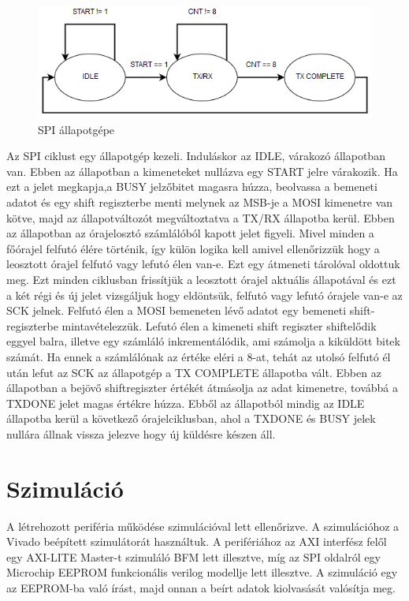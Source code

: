 \documentclass[a4paper,11pt]{article}
\begin{document}
\begin{figure}[H]
	\begin{center}
	\includegraphics[scale=0.6]{spi_statemachine.png}
	\caption{SPI állapotgépe}
	\label{fig:spistatemchn}
	\end{center}
\end{figure}


Az SPI ciklust egy állapotgép kezeli. Induláskor az IDLE, várakozó állapotban van. Ebben az állapotban a kimeneteket nullázva egy START jelre várakozik. Ha ezt a jelet megkapja,a BUSY jelzőbitet magasra húzza, beolvassa a bemeneti adatot és egy shift regiszterbe menti melynek az MSB-je a MOSI kimenetre van kötve, majd az állapotváltozót megváltoztatva a TX/RX állapotba kerül. Ebben az állapotban az órajelosztó számlálóból kapott jelet figyeli. Mivel minden a főórajel felfutó élére történik, így külön logika kell amivel ellenőrizzük hogy a leosztott órajel felfutó vagy lefutó élen van-e. Ezt egy átmeneti tárolóval oldottuk meg. Ezt minden ciklusban frissítjük a leosztott órajel aktuális állapotával és ezt a két régi és új jelet vizsgáljuk hogy eldöntsük, felfutó vagy lefutó órajele van-e az SCK jelnek. Felfutó élen a MOSI bemeneten lévő adatot egy bemeneti shift-regiszterbe mintavételezzük. Lefutó élen a kimeneti shift regiszter shiftelődik eggyel balra, illetve egy számláló inkrementálódik, ami számolja a kiküldött bitek számát. Ha ennek a számlálónak az értéke eléri a 8-at, tehát az utolsó felfutó él után lefut az SCK az állapotgép a TX COMPLETE állapotba vált. Ebben az állapotban a bejövő shiftregiszter értékét átmásolja az adat kimenetre, továbbá a TXDONE jelet magas értékre húzza. Ebből az állapotból mindig az IDLE állapotba kerül a következő órajelciklusban, ahol a TXDONE és BUSY jelek nullára állnak vissza jelezve hogy új küldésre készen áll.

\section{Szimuláció}
A létrehozott periféria működése szimulációval lett ellenőrizve. A szimulációhoz a Vivado beépített szimulátorát használtuk. A perifériához az AXI interfész felől egy AXI-LITE Master-t szimuláló BFM lett illesztve, míg az SPI oldalról egy Microchip EEPROM funkcionális verilog modellje lett illesztve. A szimuláció egy az EEPROM-ba való írást, majd onnan a beírt adatok kiolvasását valósítja meg.
\end{document}
